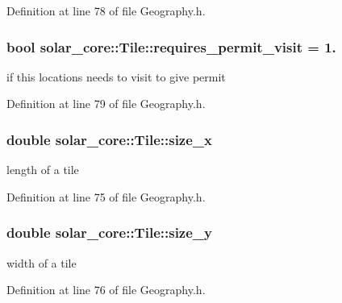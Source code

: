 Definition at line 78 of file Geography.\+h.

\hypertarget{classsolar__core_1_1_tile_a489ba61bbe83f143b98d8a866cf06f13}{}
\subsubsection[{requires\+\_\+permit\+\_\+visit}]{\setlength{\rightskip}{0pt plus 5cm}bool solar\+\_\+core\+::\+Tile\+::requires\+\_\+permit\+\_\+visit = 1.}\label{classsolar__core_1_1_tile_a489ba61bbe83f143b98d8a866cf06f13}
if this locations needs to visit to give permit 

Definition at line 79 of file Geography.\+h.

\hypertarget{classsolar__core_1_1_tile_ae8615b87d6d0c614de01b497fa63c27b}{}
\subsubsection[{size\+\_\+x}]{\setlength{\rightskip}{0pt plus 5cm}double solar\+\_\+core\+::\+Tile\+::size\+\_\+x}\label{classsolar__core_1_1_tile_ae8615b87d6d0c614de01b497fa63c27b}
length of a tile 

Definition at line 75 of file Geography.\+h.

\hypertarget{classsolar__core_1_1_tile_a698ac57539f58ed4e0a54b3135be6fb9}{}
\subsubsection[{size\+\_\+y}]{\setlength{\rightskip}{0pt plus 5cm}double solar\+\_\+core\+::\+Tile\+::size\+\_\+y}\label{classsolar__core_1_1_tile_a698ac57539f58ed4e0a54b3135be6fb9}
width of a tile 

Definition at line 76 of file Geography.\+h.

\hypertarget{classsolar__core_1_1_tile_a2062d4ffe05c6f6282975f71f2d24441}{}
